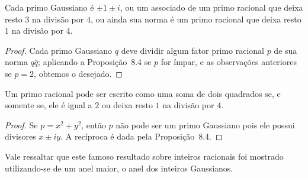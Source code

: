 \begin{corolario}
Cada primo Gaussiano é $\pm 1 \pm i$, ou um associado de um primo
racional que deixa resto $3$ na divisão por $4$, ou ainda sua norma é
um primo racional que deixa resto $1$ na divisão por $4$.    
\end{corolario}

\begin{proof}
Cada primo Gaussiano $q$ deve dividir algum fator primo racional $p$
de sua norma $q\bar{q}$; aplicando a Proposição~8.4 se $p$ for ímpar,
e as observações anteriores se $p = 2$, obtemos o desejado.
\end{proof}

\begin{corolario}[Fermat]
Um primo racional pode ser escrito como uma soma de dois quadrados se,
e somente se, ele é igual a $2$ ou deixa resto $1$ na divisão por $4$.
\end{corolario}

\begin{proof}
Se $p = x^2 + y^2$, então $p$ não pode ser um primo Gaussiano pois ele
possui divisores $x \pm iy$. A recíproca é dada pela
Proposição~8.4.
\end{proof}

Vale ressaltar que este famoso resultado sobre inteiros racionais foi
mostrado utilizando-se de um anel maior, o anel dos inteiros
Gaussianos.
